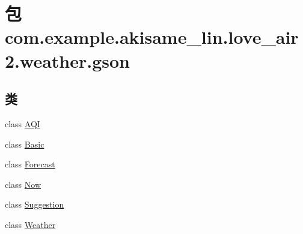 \hypertarget{namespacecom_1_1example_1_1akisame__lin_1_1love__air2_1_1weather_1_1gson}{}\section{包 com.\+example.\+akisame\+\_\+lin.\+love\+\_\+air2.\+weather.\+gson}
\label{namespacecom_1_1example_1_1akisame__lin_1_1love__air2_1_1weather_1_1gson}
\subsection*{类}
\begin{DoxyCompactItemize}
\item 
class \mbox{\hyperlink{classcom_1_1example_1_1akisame__lin_1_1love__air2_1_1weather_1_1gson_1_1_a_q_i}{A\+QI}}
\item 
class \mbox{\hyperlink{classcom_1_1example_1_1akisame__lin_1_1love__air2_1_1weather_1_1gson_1_1_basic}{Basic}}
\item 
class \mbox{\hyperlink{classcom_1_1example_1_1akisame__lin_1_1love__air2_1_1weather_1_1gson_1_1_forecast}{Forecast}}
\item 
class \mbox{\hyperlink{classcom_1_1example_1_1akisame__lin_1_1love__air2_1_1weather_1_1gson_1_1_now}{Now}}
\item 
class \mbox{\hyperlink{classcom_1_1example_1_1akisame__lin_1_1love__air2_1_1weather_1_1gson_1_1_suggestion}{Suggestion}}
\item 
class \mbox{\hyperlink{classcom_1_1example_1_1akisame__lin_1_1love__air2_1_1weather_1_1gson_1_1_weather}{Weather}}
\end{DoxyCompactItemize}
